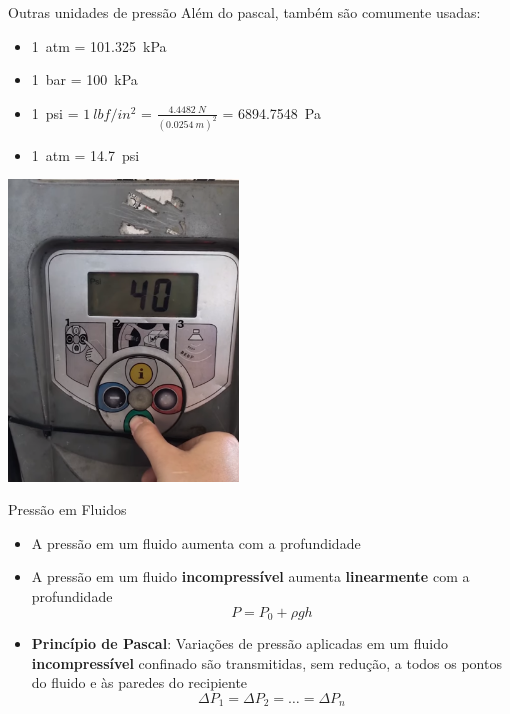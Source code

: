 \begin{frame}{Outras unidades de pressão}
    Além do pascal, também são comumente usadas:
    \begin{itemize}
        \item \SI{1}{atm} = \SI{101.325}{kPa}
        \item \SI{1}{bar} = \SI{100}{kPa}\
        \item \SI{1}{psi} = \(\SI{1}{lbf/in^2}\) = \(\displaystyle \frac{\SI{4.4482}{N}}{(\SI{0.0254}{m})^2}\) = \SI{6894.7548}{Pa}
        \item \SI{1}{atm} = \SI{14.7}{psi}
    \end{itemize}
\end{frame}

\begin{frame}{}
    \begin{center}
        \includegraphics[height=8cm]{images/psi.png}
    \end{center}
\end{frame}

\begin{frame}{Pressão em Fluidos}
    \begin{itemize}
        \item A pressão em um fluido aumenta com a profundidade
        \item A pressão em um fluido \textbf{incompressível} aumenta \textbf{linearmente} com a profundidade
            \[
                P=P_0 + \rho g h
            \]
        \item \textbf{Princípio de Pascal}: Variações de pressão aplicadas em
            um fluido \textbf{incompressível} confinado são transmitidas, sem
            redução, a todos os pontos do fluido e às paredes do recipiente
            \[
                \Delta P_1 = \Delta P_2 = \ldots = \Delta P_n
            \]
    \end{itemize}
\end{frame}

